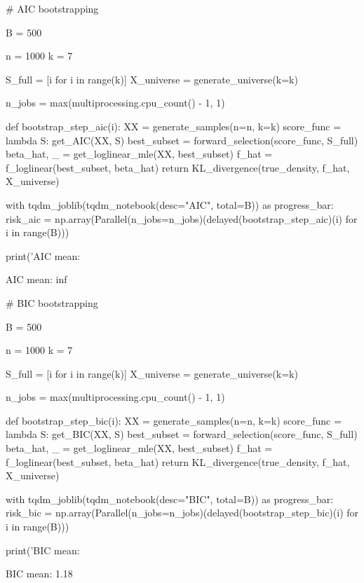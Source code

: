 \begin{python}
# AIC bootstrapping

B = 500

n = 1000
k = 7

S_full = [i for i in range(k)]
X_universe = generate_universe(k=k)

n_{j}obs = max(multiprocessing.cpu_count() - 1, 1)

def bootstrap_step_aic(i):
    XX = generate_samples(n=n, k=k)    
    score_func = lambda S: get_AIC(XX, S)
    best_subset = forward_selection(score_func, S_full)
    beta_hat, _ = get_loglinear_mle(XX, best_subset)
    f_hat = f_loglinear(best_subset, beta_hat)
    return KL_divergence(true_density, f_hat, X_universe)

with tqdm_{j}oblib(tqdm_{n}otebook(desc="AIC", total=B)) as progress_bar:
    risk_aic = np.array(Parallel(n_{j}obs=n_{j}obs)(delayed(bootstrap_step_aic)(i) for i in range(B)))

print('AIC mean: %
\end{python}

\begin{console}
AIC mean: inf
\end{console}

\begin{python}
# BIC bootstrapping

B = 500

n = 1000
k = 7

S_full = [i for i in range(k)]
X_universe = generate_universe(k=k)

n_{j}obs = max(multiprocessing.cpu_count() - 1, 1)

def bootstrap_step_bic(i):
    XX = generate_samples(n=n, k=k)    
    score_func = lambda S: get_BIC(XX, S)
    best_subset = forward_selection(score_func, S_full)
    beta_hat, _ = get_loglinear_mle(XX, best_subset)
    f_hat = f_loglinear(best_subset, beta_hat)
    return KL_divergence(true_density, f_hat, X_universe)

with tqdm_{j}oblib(tqdm_{n}otebook(desc="BIC", total=B)) as progress_bar:
    risk_bic = np.array(Parallel(n_{j}obs=n_{j}obs)(delayed(bootstrap_step_bic)(i) for i in range(B)))

print('BIC mean: %
\end{python}

\begin{console}
BIC mean: 1.18
\end{console}

